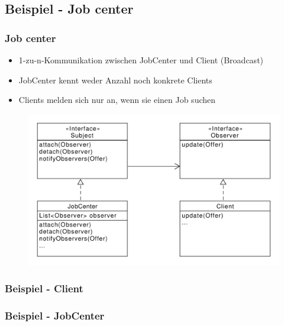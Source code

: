 \subsection{Beispiel - Job center}
\begin{frame}
	\frametitle{Job center}
	\begin{itemize}
		\item 1-zu-n-Kommunikation zwischen JobCenter und Client (Broadcast)
		\item JobCenter kennt weder Anzahl noch konkrete Clients
		\item Clients melden sich nur an, wenn sie einen Job suchen
	\end{itemize}		 
  	\begin{figure}
		\includegraphics[scale=.4]{paper/observer/arbeitsvermittlung}
	\end{figure}
\end{frame}


\begin{frame}
\frametitle{Beispiel - Client}
\end{frame}

\begin{frame}
\frametitle{Beispiel - JobCenter}
\end{frame}

